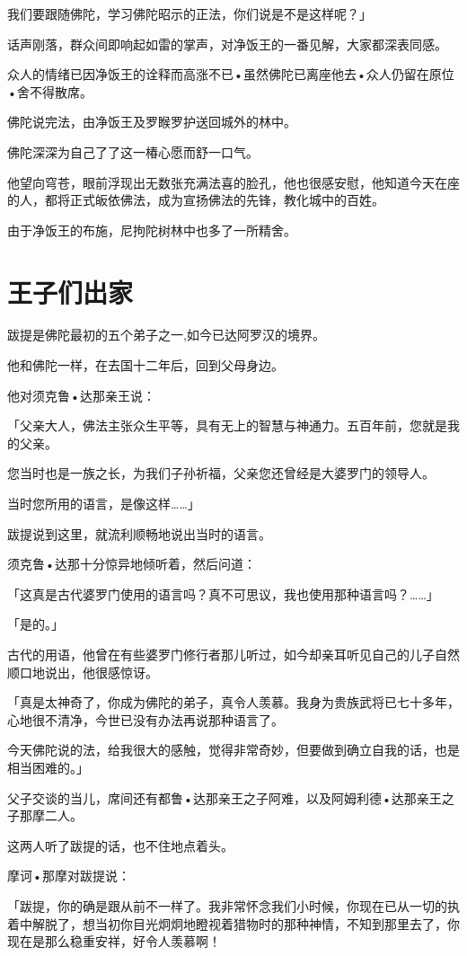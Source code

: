 \documentclass[twoside,openany]{book}
\begin{document}
我们要跟随佛陀，学习佛陀昭示的正法，你们说是不是这样呢？」

话声刚落，群众间即响起如雷的掌声，对净饭王的一番见解，大家都深表同感。

众人的情绪已因净饭王的诠释而高涨不已•虽然佛陀已离座他去•众人仍留在原位•舍不得散席。

佛陀说完法，由净饭王及罗睺罗护送回城外的林中。

佛陀深深为自己了了这一椿心愿而舒一口气。

他望向穹苍，眼前浮现出无数张充满法喜的脸孔，他也很感安慰，他知道今天在座的人，都将正式皈依佛法，成为宣扬佛法的先锋，教化城中的百姓。

由于净饭王的布施，尼拘陀树林中也多了一所精舍。

\section{王子们出家}\label{sec8.5}

跋提是佛陀最初的五个弟子之一,如今已达阿罗汉的境界。

他和佛陀一样，在去国十二年后，回到父母身边。

他对须克鲁•达那亲王说：

「父亲大人，佛法主张众生平等，具有无上的智慧与神通力。五百年前，您就是我的父亲。

您当时也是一族之长，为我们子孙祈福，父亲您还曾经是大婆罗门的领导人。

当时您所用的语言，是像这样……」

跋提说到这里，就流利顺畅地说出当时的语言。

须克鲁•达那十分惊异地倾听着，然后问道：

「这真是古代婆罗门使用的语言吗？真不可思议，我也使用那种语言吗？……」

「是的。」

古代的用语，他曾在有些婆罗门修行者那儿听过，如今却亲耳听见自己的儿子自然顺口地说出，他很感惊讶。

「真是太神奇了，你成为佛陀的弟子，真令人羡慕。我身为贵族武将已七十多年，心地很不清净，今世已没有办法再说那种语言了。

今天佛陀说的法，给我很大的感触，觉得非常奇妙，但要做到确立自我的话，也是相当困难的。」

父子交谈的当儿，席间还有都鲁•达那亲王之子阿难，以及阿姆利德•达那亲王之子那摩二人。

这两人听了跋提的话，也不住地点着头。

摩诃•那摩对跋提说：

「跋提，你的确是跟从前不一样了。我非常怀念我们小时候，你现在已从一切的执着中解脱了，想当初你目光炯炯地瞪视着猎物时的那种神情，不知到那里去了，你现在是那么稳重安祥，好令人羡慕啊！
\end{document}
